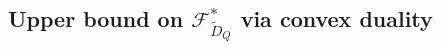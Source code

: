 \documentclass[final, 12pt]{colt2018}
\newcommand{\F}{\mathcal{F}}
\theoremstyle{definition}
\theoremstyle{plain}
\begin{document}
\begin{comment}
Finally we observe that if $y^*$ is an optimizer of the dual program,
then $x^*$ is indeed the optimum of the primal.
Because we took $y^*$ to be an optimizer of the dual program, then $g(y^*) = OPT$ so
defining $x^*$ in terms of $y^*$ by our formula, we see the inequalities in \eqref{weak-duality} collapse and hence
\[ g(y^*) = \sum_{i = 1}^n H(x_i^*) - \sum_{j = 1}^m y^*_j(a_j \cdot x^* - b_j) =\sum_{i = 1}^n H(x_i^*) = OPT. \]
I claim this implies that $x^*$ is truly an optimizer of the primal; it is clear that its objective value is optimal, so we just need to check feasibility. Suppose $x^*$ is not feasible, then some constraint $j$ is violated, so $a_j \cdot x^* - b_j > 0$. Now consider increasing $y^*_j$ by a very tiny $\epsilon$ to get $y'$: clearly $L(x^*,y') < L(x,y)$ and also our calculation showed the optimizer $x^*$ was unique; by compactness and continuity of $L$, if $\epsilon$ is sufficiently small no other point $x$ can rise up to replace $x^*$, so $g(y') < g(y^*)$. In other words, $y^*$ could not have been the optimizer of the dual program --- contradiction. 
\end{comment}

\subsection{Upper bound on $\F^{*}_{\tilde{D}_Q}$ via convex duality}
\end{document}

